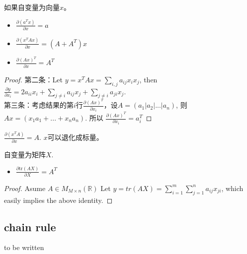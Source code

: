 \documentclass[11pt,fleqn]{book} %
\def\R{\mathbb{R}}
\begin{document}
\begin{CJK}{UTF8}{gkai}
\begin{property}
    如果自变量为向量$x$。
    \begin{itemize}
        \item $\frac{\partial (a^T x)}{\partial x} = a$
        \item $\frac{\partial (x^TAx)}{\partial x} = (A + A^T)x$
        \item $\frac{\partial (Ax)^T}{\partial x} = A^T$
    \end{itemize}
\end{property}
\begin{proof}
    第二条：Let $y = x^TAx = \sum_{i,j}a_{ij}x_ix_j$, then $\frac{\partial y}{\partial x_i} = 2a_{ii}x_i + \sum_{j \neq i} a_{ij}x_j + \sum_{j \neq i}a_{ji}x_j$.     \\
    第三条：考虑结果的第$i$行$\frac{\partial (Ax)^T}{\partial x_i}$，设$A = (a_1 | a_2 | ... | a_n)$, 则 $Ax = (x_1a_1 + ... + x_na_n)$. 所以 $\frac{\partial (Ax)^T}{\partial x_i} = a_i^T$
\end{proof}
\begin{corollary}
    $\frac{\partial (x^TA)}{\partial x} = A$. $x$可以退化成标量。
\end{corollary}
\begin{property}
    自变量为矩阵$X$. 
    \begin{itemize}
        \item $\frac{\partial \text{tr} (AX)}{\partial X} = A^T$
    \end{itemize}
\end{property}
\begin{proof}
    Asume $A \in M_{M\times n}(\R)$
    Let $y = tr(AX) = \sum_{i = 1}^{m}\sum_{j = 1}^{n} a_{ij}x_{ji}$, which easily implies the above identity.
\end{proof}

\subsection{chain rule}
to be written


\end{CJK}
\end{document}
